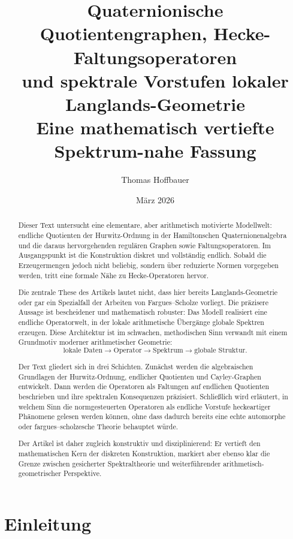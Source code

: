 \documentclass[12pt,a4paper]{article}
\title{\textbf{Quaternionische Quotientengraphen, Hecke-Faltungsoperatoren\\
		und spektrale Vorstufen lokaler Langlands-Geometrie}\\[0.5em]
	\large Eine mathematisch vertiefte Spektrum-nahe Fassung}
\author{Thomas Hoffbauer}
\date{März 2026}
\theoremstyle{plain}
\theoremstyle{definition}
\theoremstyle{remark}
\begin{document}
	\maketitle
	
	\begin{abstract}
		Dieser Text untersucht eine elementare, aber arithmetisch motivierte Modellwelt:
		endliche Quotienten der Hurwitz-Ordnung in der Hamiltonschen Quaternionenalgebra
		und die daraus hervorgehenden regulären Graphen sowie Faltungsoperatoren.
		Im Ausgangspunkt ist die Konstruktion diskret und vollständig endlich.
		Sobald die Erzeugermengen jedoch nicht beliebig, sondern über reduzierte Normen
		vorgegeben werden, tritt eine formale Nähe zu Hecke-Operatoren hervor.
		
		Die zentrale These des Artikels lautet nicht, dass hier bereits Langlands-Geometrie
		oder gar ein Spezialfall der Arbeiten von Fargues--Scholze vorliegt.
		Die präzisere Aussage ist bescheidener und mathematisch robuster:
		Das Modell realisiert eine endliche Operatorwelt, in der lokale arithmetische
		Übergänge globale Spektren erzeugen. Diese Architektur ist im schwachen,
		methodischen Sinn verwandt mit einem Grundmotiv moderner arithmetischer Geometrie:
		\[
		\text{lokale Daten}
		\longrightarrow
		\text{Operator}
		\longrightarrow
		\text{Spektrum}
		\longrightarrow
		\text{globale Struktur}.
		\]
		
		Der Text gliedert sich in drei Schichten.
		Zunächst werden die algebraischen Grundlagen der Hurwitz-Ordnung,
		endlicher Quotienten und Cayley-Graphen entwickelt.
		Dann werden die Operatoren als Faltungen auf endlichen Quotienten beschrieben
		und ihre spektralen Konsequenzen präzisiert.
		Schließlich wird erläutert, in welchem Sinn die normgesteuerten Operatoren
		als endliche Vorstufe heckeartiger Phänomene gelesen werden können,
		ohne dass dadurch bereits eine echte automorphe oder fargues--scholzesche
		Theorie behauptet würde.
		
		Der Artikel ist daher zugleich konstruktiv und disziplinierend:
		Er vertieft den mathematischen Kern der diskreten Konstruktion,
		markiert aber ebenso klar die Grenze zwischen gesicherter Spektraltheorie
		und weiterführender arithmetisch-geometrischer Perspektive.
	\end{abstract}
	
	\tableofcontents
	
	\section{Einleitung}
	
\end{document}
